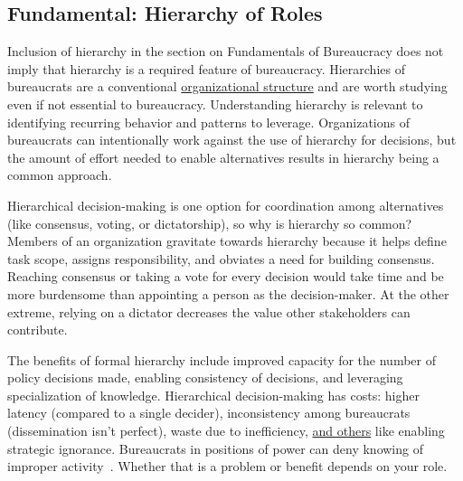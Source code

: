 \subsection*{Fundamental: Hierarchy of Roles\label{sec:hierarchy-of-roles}}

Inclusion of hierarchy in the section on Fundamentals of Bureaucracy does not imply that hierarchy is a required feature of bureaucracy. Hierarchies of bureaucrats are a conventional \href{https://en.wikipedia.org/wiki/Organizational_structure}{organizational structure}
%
and are worth studying even if not essential to bureaucracy. Understanding hierarchy is relevant to identifying recurring behavior and patterns to leverage.
Organizations of bureaucrats can intentionally work against the use of hierarchy for decisions, but the amount of effort needed to enable alternatives results in hierarchy being a common approach.


Hierarchical decision-making is one option for coordination among alternatives (like consensus, voting, or dictatorship), so why is hierarchy so common? Members of an organization gravitate towards hierarchy because it helps define task scope, assigns responsibility, and obviates a need for building consensus. Reaching consensus or taking a vote for every decision would take time and be more burdensome than appointing a person as the decision-maker. At the other extreme, relying on a dictator decreases the value other stakeholders can contribute. 


The benefits of formal hierarchy include improved capacity for the number of policy decisions made, enabling consistency of decisions, and leveraging specialization of knowledge. 
Hierarchical decision-making has costs: higher latency (compared to a single decider), inconsistency among bureaucrats (dissemination isn't perfect), waste due to inefficiency,  
\hyperref[sec:unavoidable-hazards]{and others}
%
like enabling strategic ignorance. Bureaucrats in positions of power can deny knowing of improper activity~\cite{2019_McGoey, 2012_McGoey}.  Whether that is a problem or benefit depends on your role. 

